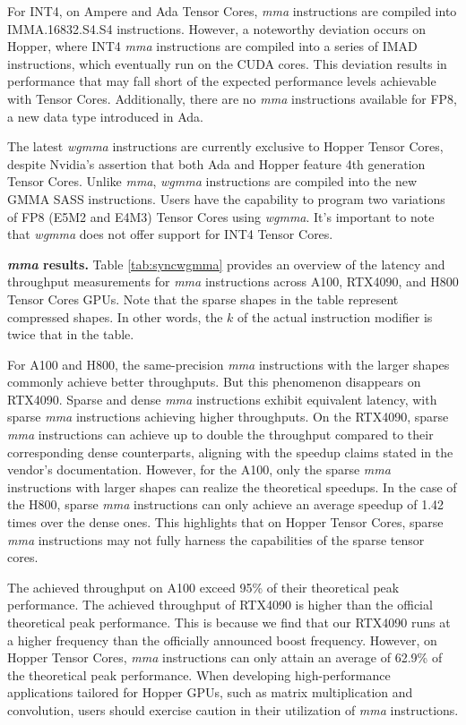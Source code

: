 For INT4, on Ampere and Ada Tensor Cores, \emph{mma} instructions are compiled into IMMA.16832.S4.S4 instructions. However, a noteworthy deviation occurs on Hopper, where INT4 \emph{mma} instructions are compiled into a series of IMAD instructions, which eventually run on the CUDA cores. This deviation results in performance that may fall short of the expected performance levels achievable with Tensor Cores. Additionally, there are no \emph{mma} instructions available for FP8, a new data type introduced in Ada.

The latest \emph{wgmma} instructions are currently exclusive to Hopper Tensor Cores, despite Nvidia's assertion that both Ada and Hopper feature 4th generation Tensor Cores. Unlike \emph{mma}, \emph{wgmma} instructions are compiled into the new GMMA SASS instructions. Users have the capability to program two variations of FP8 (E5M2 and E4M3) Tensor Cores using \emph{wgmma}. It's important to note that \emph{wgmma} does not offer support for INT4 Tensor Cores.

\textbf{\emph{mma} results.} Table \ref{tab:syncwgmma} provides an overview of the latency and throughput measurements for \emph{mma} instructions across A100, RTX4090, and H800 Tensor Cores GPUs. Note that the sparse shapes in the table represent compressed shapes. In other words, the $k$ of the actual instruction modifier is twice that in the table.

For A100 and H800, the same-precision \emph{mma} instructions with the larger shapes commonly achieve better throughputs. But this phenomenon disappears on RTX4090. Sparse and dense \emph{mma} instructions exhibit equivalent latency, with sparse \emph{mma} instructions achieving higher throughputs. On the RTX4090, sparse \emph{mma} instructions can achieve up to double the throughput compared to their corresponding dense counterparts, aligning with the speedup claims stated in the vendor's documentation. However, for the A100, only the sparse \emph{mma} instructions with larger shapes can realize the theoretical speedups. In the case of the H800, sparse \emph{mma} instructions can only achieve an average speedup of 1.42 times over the dense ones. This highlights that on Hopper Tensor Cores, sparse \emph{mma} instructions may not fully harness the capabilities of the sparse tensor cores.

The achieved throughput on A100 exceed 95\% of their theoretical peak performance. The achieved throughput of RTX4090 is higher than the official theoretical peak performance. This is because we find that our RTX4090 runs at a higher frequency than the officially announced boost frequency. However, on Hopper Tensor Cores, \emph{mma} instructions can only attain an average of 62.9\% of the theoretical peak performance. When developing high-performance applications tailored for Hopper GPUs, such as matrix multiplication and convolution, users should exercise caution in their utilization of \emph{mma} instructions.

